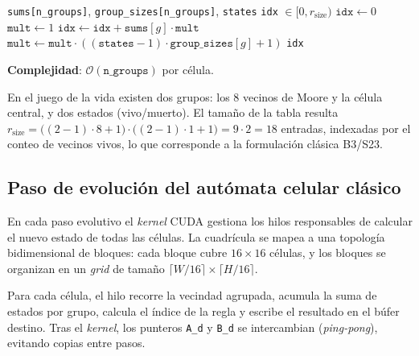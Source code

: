\begin{breakablealgorithm}
\caption{IndiceRegla: vector de conteos $\to$ índice lineal}
\label{alg:indice}
\begin{algorithmic}[1]
\Require \texttt{sums[n\_groups]}, \texttt{group\_sizes[n\_groups]}, \texttt{states}
\Ensure \texttt{idx} $\in [0, r_{\text{size}})$
\State $\texttt{idx} \gets 0$
\State $\texttt{mult} \gets 1$
    \State $\texttt{idx} \gets \texttt{idx} + \texttt{sums}[g] \cdot \texttt{mult}$
    \State $\texttt{mult} \gets \texttt{mult} \cdot ((\texttt{states} - 1) \cdot \texttt{group\_sizes}[g] + 1)$
\EndFor
\State \Return \texttt{idx}
\end{algorithmic}
\end{breakablealgorithm}

\textbf{Complejidad}: $\mathcal{O}(\texttt{n\_groups})$ por célula. 

En el juego de la vida existen dos grupos: los 8 vecinos de Moore y la célula central, y dos estados (vivo/muerto). El tamaño de la tabla resulta $r_{\text{size}} = \bigl((2-1)\cdot 8  + 1\bigr)\cdot\bigl((2-1)\cdot 1 + 1\bigr) = 9 \cdot 2 = 18$ entradas, indexadas por el conteo de vecinos vivos, lo que corresponde a la formulación clásica B3/S23.

\subsection{Paso de evolución del autómata celular clásico}

En cada paso evolutivo el \textit{kernel} CUDA gestiona los hilos responsables de calcular el nuevo estado de todas las células. La cuadrícula se mapea a una topología bidimensional de bloques: cada bloque cubre $16 \times 16$ células, y los bloques se organizan en un \textit{grid} de tamaño $\lceil W/16 \rceil \times \lceil H/16 \rceil$.

Para cada célula, el hilo recorre la vecindad agrupada, acumula la suma de estados por grupo, calcula el índice de la regla y escribe el resultado en el búfer destino. Tras el \textit{kernel}, los punteros \texttt{A\_d} y \texttt{B\_d} se intercambian (\textit{ping-pong}), evitando copias entre pasos.

